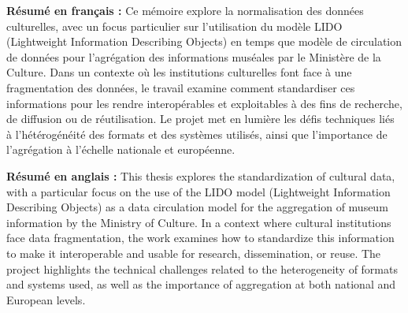 \textbf{Résumé en français :}
Ce mémoire explore la normalisation des données culturelles, avec un focus particulier sur l'utilisation du modèle LIDO (Lightweight Information Describing Objects) en temps que modèle de circulation de données pour l'agrégation des informations muséales par le Ministère de la Culture. Dans un contexte où les institutions culturelles font face à une fragmentation des données, le travail examine comment standardiser ces informations pour les rendre interopérables et exploitables à des fins de recherche, de diffusion ou de réutilisation. Le projet met en lumière les défis techniques liés à l'hétérogénéité des formats et des systèmes utilisés, ainsi que l'importance de l'agrégation à l'échelle nationale et européenne. \newline

\textbf{Résumé en anglais :}
This thesis explores the standardization of cultural data, with a particular focus on the use of the LIDO model (Lightweight Information Describing Objects) as a data circulation model for the aggregation of museum information by the Ministry of Culture. In a context where cultural institutions face data fragmentation, the work examines how to standardize this information to make it interoperable and usable for research, dissemination, or reuse. The project highlights the technical challenges related to the heterogeneity of formats and systems used, as well as the importance of aggregation at both national and European levels.